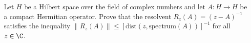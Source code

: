 Let $H$ be a Hilbert space over the field of complex numbers and let
$A:H\rightarrow H$ be a compact Hermitian operator. Prove that the
resolvent $R_z(A)=(z-A)^{-1}$ satisfies the inequality $\|R_z(A)\|\leq
[\mathrm{dist}(z,\mathrm{spectrum}(A))]^{-1}$ for all $z\in \C$.
